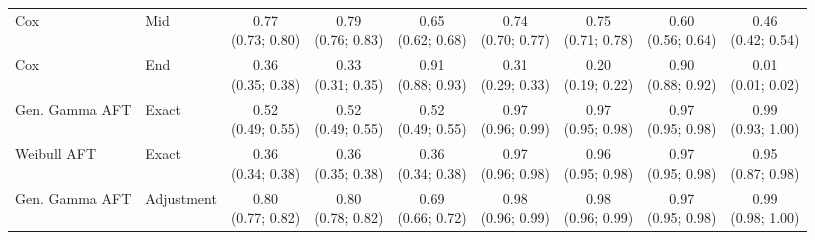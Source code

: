 \begin{table*}[htbp]
\begin{sideways}
\begin{tabular}{llccccccc}
Cox & Mid & \makecell{0.77\\(0.73; 0.80)} & \makecell{0.79\\(0.76; 0.83)} & \makecell{0.65\\(0.62; 0.68)} & \makecell{0.74\\(0.70; 0.77)} & \makecell{0.75\\(0.71; 0.78)} & \makecell{0.60\\(0.56; 0.64)} & \makecell{0.46\\(0.42; 0.54)} \\
Cox & End & \makecell{0.36\\(0.35; 0.38)} & \makecell{0.33\\(0.31; 0.35)} & \makecell{0.91\\(0.88; 0.93)} & \makecell{0.31\\(0.29; 0.33)} & \makecell{0.20\\(0.19; 0.22)} & \makecell{0.90\\(0.88; 0.92)} & \makecell{0.01\\(0.01; 0.02)} \\
\addlinespace
Gen. Gamma AFT & Exact & \makecell{0.52\\(0.49; 0.55)} & \makecell{0.52\\(0.49; 0.55)} & \makecell{0.52\\(0.49; 0.55)} & \makecell{0.97\\(0.96; 0.99)} & \makecell{0.97\\(0.95; 0.98)} & \makecell{0.97\\(0.95; 0.98)} & \makecell{0.99\\(0.93; 1.00)} \\
\addlinespace
Weibull AFT & Exact & \makecell{0.36\\(0.34; 0.38)} & \makecell{0.36\\(0.35; 0.38)} & \makecell{0.36\\(0.34; 0.38)} & \makecell{0.97\\(0.96; 0.98)} & \makecell{0.96\\(0.95; 0.98)} & \makecell{0.97\\(0.95; 0.98)} & \makecell{0.95\\(0.87; 0.98)} \\
\addlinespace
Gen. Gamma AFT & Adjustment & \makecell{0.80\\(0.77; 0.82)} & \makecell{0.80\\(0.78; 0.82)} & \makecell{0.69\\(0.66; 0.72)} & \makecell{0.98\\(0.96; 0.99)} & \makecell{0.98\\(0.96; 0.99)} & \makecell{0.97\\(0.95; 0.98)} & \makecell{0.99\\(0.98; 1.00)} \\

\end{tabular}
\end{sideways}
\end{table*}
